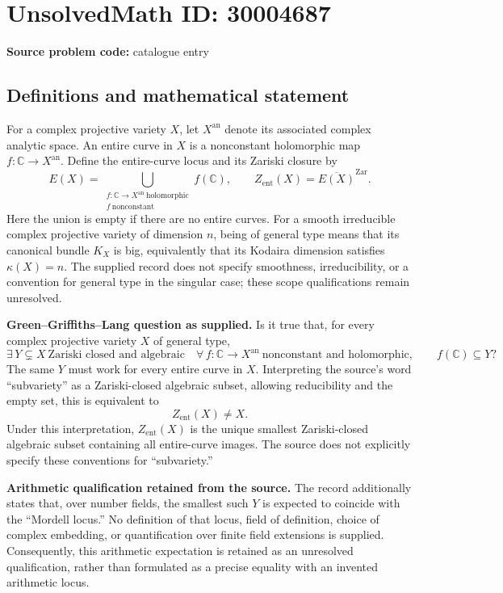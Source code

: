 \documentclass[11pt]{article}
\newcommand{\C}{\mathbb{C}}
\begin{document}
\section*{UnsolvedMath ID: 30004687}
\textbf{Source problem code:} catalogue entry
\subsection{Definitions and mathematical statement}
For a complex projective variety \(X\), let \(X^{\mathrm{an}}\) denote its associated complex analytic space. An entire curve in \(X\) is a nonconstant holomorphic map \(f:\C\to X^{\mathrm{an}}\). Define the entire-curve locus and its Zariski closure by
\[
E(X)=\bigcup_{\substack{f:\C\to X^{\mathrm{an}}\ \mathrm{holomorphic}\\ f\ \mathrm{nonconstant}}}f(\C),
\qquad
Z_{\mathrm{ent}}(X)=\overline{E(X)}^{\mathrm{Zar}}.
\]
Here the union is empty if there are no entire curves. For a smooth irreducible complex projective variety of dimension \(n\), being of general type means that its canonical bundle \(K_X\) is big, equivalently that its Kodaira dimension satisfies \(\kappa(X)=n\). The supplied record does not specify smoothness, irreducibility, or a convention for general type in the singular case; these scope qualifications remain unresolved.

\textbf{Green--Griffiths--Lang question as supplied.} Is it true that, for every complex projective variety \(X\) of general type,
\[
\exists\,Y\subsetneq X\ \text{Zariski closed and algebraic}\quad
\forall\,f:\C\to X^{\mathrm{an}}\ \text{nonconstant and holomorphic},
\qquad f(\C)\subseteq Y?
\]
The same \(Y\) must work for every entire curve in \(X\). Interpreting the source's word ``subvariety'' as a Zariski-closed algebraic subset, allowing reducibility and the empty set, this is equivalent to
\[
Z_{\mathrm{ent}}(X)\ne X.
\]
Under this interpretation, \(Z_{\mathrm{ent}}(X)\) is the unique smallest Zariski-closed algebraic subset containing all entire-curve images. The source does not explicitly specify these conventions for ``subvariety.''

\textbf{Arithmetic qualification retained from the source.} The record additionally states that, over number fields, the smallest such \(Y\) is expected to coincide with the ``Mordell locus.'' No definition of that locus, field of definition, choice of complex embedding, or quantification over finite field extensions is supplied. Consequently, this arithmetic expectation is retained as an unresolved qualification, rather than formulated as a precise equality with an invented arithmetic locus.
\end{document}
